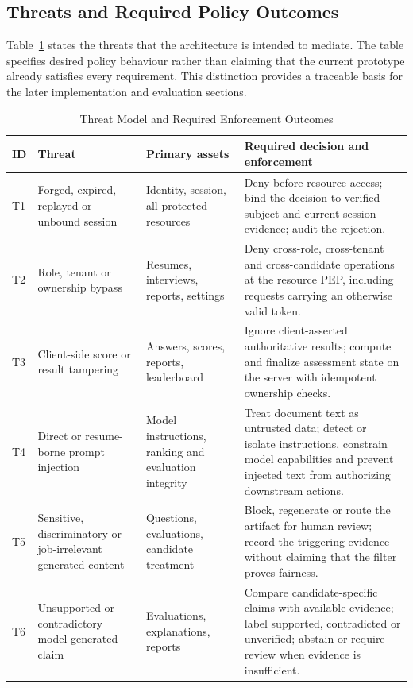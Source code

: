 \documentclass[conference]{IEEEtran}
\begin{document}
\subsection{Threats and Required Policy Outcomes}

Table~\ref{tab:threat-model} states the threats that the architecture is intended to mediate. The table specifies desired policy behaviour rather than claiming that the current prototype already satisfies every requirement. This distinction provides a traceable basis for the later implementation and evaluation sections.

\begin{table}[t]
\caption{Threat Model and Required Enforcement Outcomes}
\label{tab:threat-model}
\centering
\footnotesize
\renewcommand{\arraystretch}{1.12}
\begin{tabular}{@{}p{}p{}p{}p{}@{}}
\toprule
\textbf{ID} & \textbf{Threat} & \textbf{Primary assets} & \textbf{Required decision and enforcement} \\
\midrule
T1 & Forged, expired, replayed or unbound session & Identity, session, all protected resources & Deny before resource access; bind the decision to verified subject and current session evidence; audit the rejection. \\
T2 & Role, tenant or ownership bypass & Resumes, interviews, reports, settings & Deny cross-role, cross-tenant and cross-candidate operations at the resource PEP, including requests carrying an otherwise valid token. \\
T3 & Client-side score or result tampering & Answers, scores, reports, leaderboard & Ignore client-asserted authoritative results; compute and finalize assessment state on the server with idempotent ownership checks. \\
T4 & Direct or resume-borne prompt injection & Model instructions, ranking and evaluation integrity & Treat document text as untrusted data; detect or isolate instructions, constrain model capabilities and prevent injected text from authorizing downstream actions. \\
T5 & Sensitive, discriminatory or job-irrelevant generated content & Questions, evaluations, candidate treatment & Block, regenerate or route the artifact for human review; record the triggering evidence without claiming that the filter proves fairness. \\
T6 & Unsupported or contradictory model-generated claim & Evaluations, explanations, reports & Compare candidate-specific claims with available evidence; label supported, contradicted or unverified; abstain or require review when evidence is insufficient. \\

\end{tabular}
\end{table}
\end{document}
